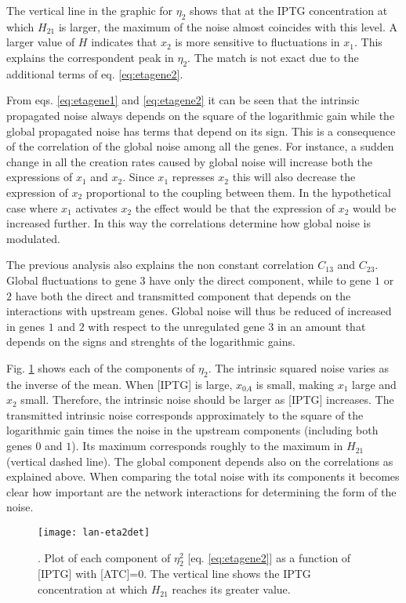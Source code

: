 The vertical line in the graphic for $\eta_2$ shows that at the IPTG concentration at which $H_{21}$ is larger, the maximum of the noise almost coincides with this level. A larger value of $H$ indicates that $x_2$ is more sensitive to fluctuations in $x_1$. This explains the correspondent peak in $\eta_2$. The match is not exact due to the additional terms of eq. \eqref{eq:etagene2}. 

From eqs. \eqref{eq:etagene1} and \eqref{eq:etagene2} it can be seen that the intrinsic propagated noise always depends on the square of the logarithmic gain while the global propagated noise has terms that depend on its sign. This is a consequence of the correlation of the global noise among all the genes. For instance, a sudden change in all the creation rates caused by global noise will increase both the expressions of $x_1$ and $x_2$. Since $x_1$ represses $x_2$ this will also decrease the expression of $x_2$ proportional to the coupling between them. In the hypothetical case where $x_1$ activates $x_2$ the effect would be that the expression of $x_2$ would be increased further. In this way the correlations determine how global noise is modulated.

The previous analysis also explains the non constant correlation $C_{13}$ and $C_{23}$. Global fluctuations to gene $3$ have only the direct component, while to gene $1$ or $2$ have both the direct and transmitted component that depends on the interactions with upstream genes. Global noise will thus be reduced of increased in genes $1$ and $2$ with respect to the unregulated gene $3$ in an amount that depends on the signs and strenghts of the logarithmic gains.

Fig. \ref{fig:lan-eta2det} shows each of the components of $\eta_2$. The intrinsic squared noise varies as the inverse of the mean. When [IPTG] is large, $x_{0A}$ is small, making $x_1$ large and $x_2$ small. Therefore, the intrinsic noise should be larger as [IPTG] increases. The transmitted intrinsic noise corresponds approximately to the square of the logarithmic gain times the noise in the upstream components (including both genes $0$ and $1$). Its maximum corresponds roughly to the maximum in $H_{21}$ (vertical dashed line). The global component depends also on the correlations as explained above. When comparing the total noise with its components it becomes clear how important are the network interactions for determining the form of the noise.

\begin{figure}[H]
  \centering
  \texttt{[image: lan-eta2det]}
  \caption[Components of the noise]{\label{fig:lan-eta2det}. Plot of each component of $\eta_2^2$ [eq. \eqref{eq:etagene2}] as a function of [IPTG] with [ATC]=0. The vertical line shows the IPTG concentration at which $H_{21}$ reaches its greater value.}
\end{figure}

